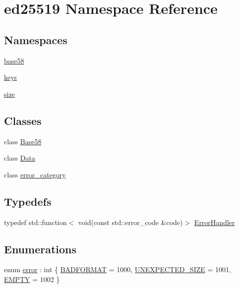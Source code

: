 \hypertarget{namespaceed25519}{}\section{ed25519 Namespace Reference}
\label{namespaceed25519}
\subsection*{Namespaces}
\begin{DoxyCompactItemize}
\item 
 \mbox{\hyperlink{namespaceed25519_1_1base58}{base58}}
\item 
 \mbox{\hyperlink{namespaceed25519_1_1keys}{keys}}
\item 
 \mbox{\hyperlink{namespaceed25519_1_1size}{size}}
\end{DoxyCompactItemize}
\subsection*{Classes}
\begin{DoxyCompactItemize}
\item 
class \mbox{\hyperlink{classed25519_1_1_base58}{Base58}}
\item 
class \mbox{\hyperlink{classed25519_1_1_data}{Data}}
\item 
class \mbox{\hyperlink{classed25519_1_1error__category}{error\+\_\+category}}
\end{DoxyCompactItemize}
\subsection*{Typedefs}
\begin{DoxyCompactItemize}
\item 
typedef std\+::function$<$ void(const std\+::error\+\_\+code \&code)$>$ \mbox{\hyperlink{namespaceed25519_a6ba572942b3c18591fc869d52a6b16e6}{Error\+Handler}}
\end{DoxyCompactItemize}
\subsection*{Enumerations}
\begin{DoxyCompactItemize}
\item 
enum \mbox{\hyperlink{namespaceed25519_ac93d0b5156eaca22197055e902920bc4}{error}} \+: int \{ \mbox{\hyperlink{namespaceed25519_ac93d0b5156eaca22197055e902920bc4a28729b5efcbf8605d4412dbb86c3963b}{B\+A\+D\+F\+O\+R\+M\+AT}} = 1000, 
\mbox{\hyperlink{namespaceed25519_ac93d0b5156eaca22197055e902920bc4a4a6895889f9590d64f64599b968a48b0}{U\+N\+E\+X\+P\+E\+C\+T\+E\+D\+\_\+\+S\+I\+ZE}} = 1001, 
\mbox{\hyperlink{namespaceed25519_ac93d0b5156eaca22197055e902920bc4ad16a8ea865652b7e7222111ab6f7ea36}{E\+M\+P\+TY}} = 1002
 \}
\end{DoxyCompactItemize}
